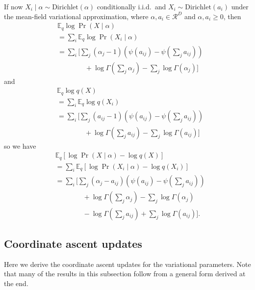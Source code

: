 \documentclass{article}
\newcommand{\Dirichlet}{\ensuremath{\mathrm{Dirichlet}}}
\newcommand{\R}{\ensuremath{\mathcal{R}}}
\newcommand{\Eq}{\ensuremath{\mathbb{E}_q\xspace}}
\begin{document}
If now $X_i \mid \alpha \sim \Dirichlet(\alpha)$ conditionally i.i.d.\ and $X_i \sim \Dirichlet(a_i)$ under the mean-field variational approximation, where $\alpha, a_i \in \R^D$ and $\alpha, a_i \ge 0$, then
\begin{align*}
    &\Eq \log \Pr(X \mid \alpha) \\
    &= \sum_i \Eq \log \Pr(X_i \mid \alpha) \\
    &= \sum_i \Bigg[ \sum_j (\alpha_j - 1) \left( \psi(a_{ij}) - \psi\left(\sum_j a_{ij}\right) \right) \\
    &\qquad\qquad + \log \Gamma\left( \sum_j \alpha_j \right) - \sum_j \log \Gamma\left( \alpha_j \right) \Bigg]
\end{align*}
and
\begin{align*}
    &\Eq \log q(X) \\
    &= \sum_i \Eq \log q(X_i) \\
    &= \sum_i \Bigg[ \sum_j (a_{ij} - 1) \left( \psi(a_{ij}) - \psi\left(\sum_j a_{ij}\right) \right) \\
    &\qquad\qquad + \log \Gamma\left( \sum_j a_{ij} \right) - \sum_j \log \Gamma\left( a_{ij} \right) \Bigg]
\end{align*}
so we have
\begin{align*}
    &\Eq \left[ \log \Pr(X \mid \alpha) - \log q(X) \right] \\
    &= \sum_i \Eq \left[ \log \Pr(X_i \mid \alpha) - \log q(X_i) \right] \\
    &= \sum_i \Bigg[ \sum_j (\alpha_j - a_{ij}) \left( \psi(a_{ij}) - \psi\left(\sum_j a_{ij}\right) \right) \\
    &\qquad\qquad + \log \Gamma\left( \sum_j \alpha_j \right) - \sum_j \log \Gamma\left( \alpha_j \right) \\
    &\qquad\qquad - \log \Gamma\left( \sum_j a_{ij} \right) + \sum_j \log \Gamma\left( a_{ij} \right) \Bigg] .
\end{align*}


\subsection*{Coordinate ascent updates}


Here we derive the coordinate ascent updates for the variational parameters.  Note that many of the results in this subsection follow from a general form derived at the end.
\end{document}
